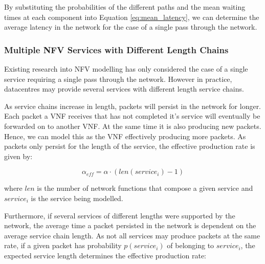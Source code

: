 By substituting the probabilities of the different paths and the mean waiting times at each component into Equation \ref{eq:mean_latency}, we can determine the average latency in the network for the case of a single pass through the network.

\subsubsection{Multiple NFV Services with Different Length Chains}
Existing research into NFV modelling has only considered the case of a single service requiring a single pass through the network. However in practice, datacentres may provide several services with different length service chains.


As service chains increase in length, packets will persist in the network for longer. Each packet a VNF receives that has not completed it's service will eventually be forwarded on to another VNF. At the same time it is also producing new packets. Hence, we can model this as the VNF effectively producing more packets. As packets only persist for the length of the service, the effective production rate is given by:

\begin{equation}
\label{eq:alpha_eff_single}
\alpha_{eff} = \alpha \cdot (len(service_i) - 1)
\end{equation}

\noindent where $len$ is the number of network functions that compose a given service and $service_i$ is the service being modelled.

Furthermore, if several services of different lengths were supported by the network, the average time a packet persisted in the network is dependent on the average service chain length. As not all services may produce packets at the same rate, if a given packet has probability $p(service_i)$ of belonging to $service_i$, the expected service length determines the effective production rate:

